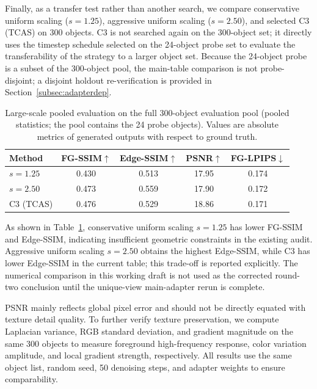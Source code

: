 \documentclass[times,twocolumn,final]{elsarticle}
\begin{document}
\iffalse

Finally, as a transfer test rather than another search, we compare conservative uniform scaling ($s = 1.25$), aggressive uniform scaling ($s = 2.50$), and selected C3 (TCAS) on 300 objects. C3 is not searched again on the 300-object set; it directly uses the timestep schedule selected on the 24-object probe set to evaluate the transferability of the strategy to a larger object set. Because the 24-object probe is a subset of the 300-object pool, the main-table comparison is not probe-disjoint; a disjoint holdout re-verification is provided in Section~\ref{subsec:adapterdep}.

\begin{table}[t]
\centering
\caption{Large-scale pooled evaluation on the full 300-object evaluation pool (pooled statistics; the pool contains the 24 probe objects). Values are absolute metrics of generated outputs with respect to ground truth.}
\label{tab:300obj}
\small\setlength{\tabcolsep}{4pt}
\begin{tabular}{lcccc}
\toprule
Method & FG-SSIM$\uparrow$ & Edge-SSIM$\uparrow$ & PSNR$\uparrow$ & FG-LPIPS$\downarrow$ \\
\midrule
$s = 1.25$ & 0.430 & 0.513 & 17.95 & 0.174 \\
$s = 2.50$ & 0.473 & 0.559 & 17.90 & 0.172 \\
C3 (TCAS) & 0.476 & 0.529 & 18.86 & 0.171 \\
\bottomrule
\end{tabular}
\end{table}


As shown in Table~\ref{tab:300obj}, conservative uniform scaling $s = 1.25$ has lower FG-SSIM and Edge-SSIM, indicating insufficient geometric constraints in the existing audit. Aggressive uniform scaling $s = 2.50$ obtains the highest Edge-SSIM, while C3 has lower Edge-SSIM in the current table; this trade-off is reported explicitly. The numerical comparison in this working draft is not used as the corrected round-two conclusion until the unique-view main-adapter rerun is complete.

PSNR mainly reflects global pixel error and should not be directly equated with texture detail quality. To further verify texture preservation, we compute Laplacian variance, RGB standard deviation, and gradient magnitude on the same 300 objects to measure foreground high-frequency response, color variation amplitude, and local gradient strength, respectively. All results use the same object list, random seed, 50 denoising steps, and adapter weights to ensure comparability.
\end{document}
